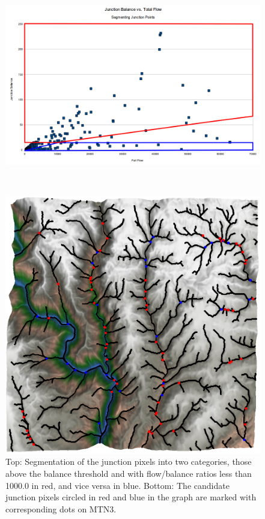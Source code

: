 \begin{figure}
\centering
\begin{minipage}{0.55\linewidth}
\begin{minipage}{\textwidth}
\begin{center}
\includegraphics[width=\linewidth]{images/JunctionBalanceVsFullFlow_Annotated_WithRatio_AndBalanceLimit.png}
\end{center}
\end{minipage}
\\
\begin{minipage}{0.99\textwidth}
\begin{center}
\includegraphics[width=\linewidth]{images/FlowToBalanceRatioWithBalanceLimitOf10.png}
\end{center}
\end{minipage}
\end{minipage}
\caption[A segmentation for pruning and dissecting]{\label{figure:SegmentedJunctionBalance2} Top: Segmentation of the junction pixels into two categories, those above the balance threshold and with flow/balance ratios less than 1000.0 in red, and vice versa in blue. Bottom: The candidate junction pixels circled in red and blue in the graph are marked with corresponding dots on MTN3.}
\end{figure}

